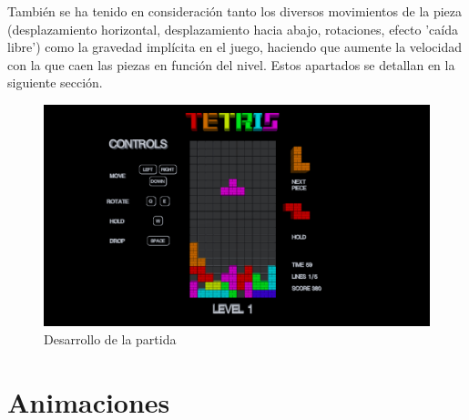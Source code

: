 \documentclass[11pt,a4paper]{article}
\begin{document}
También se ha tenido en consideración tanto los diversos movimientos de la pieza (desplazamiento horizontal, desplazamiento hacia abajo, rotaciones, efecto 'caída libre') como la gravedad implícita en el juego, haciendo que aumente la velocidad con la que caen las piezas en función del nivel. Estos apartados se detallan en la siguiente sección.

\begin{figure}[H]
    \centering
    \includegraphics[scale=0.29]{game.jpg}
    \caption{Desarrollo de la partida}
\end{figure}

\newpage

\section{Animaciones}
\end{document}
